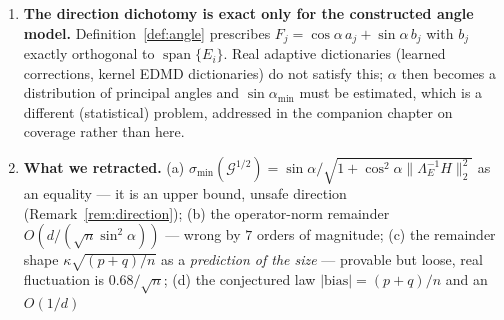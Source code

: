\documentclass[11pt]{article}
\theoremstyle{remark}
\newcommand{\Gr}{\mathcal{G}}
\newcommand{\Le}{\Lambda_E}
\newcommand{\Cnorm}{\bigl\|\Le^{-1}H\bigr\|_2^2}
\begin{document}
\begin{enumerate}
\noindent Both factors move as predicted ($q_1$ up, $q_2$ down) and the product \emph{leaves
$1$ downward}: the cancellation degrades from $0.9935$ to $0.9747$ at $\rho=0.95$, $n=200$,
and $q_1q_2$ stays monotone in $\rho$ and closer to $1$ at $n=600$. Every cell satisfies
$\mathrm{err}/\mathrm{bound}<1$, and the four-factor identity \eqref{eq:factor} still closes
per trial ($0.8776$ against $0.8776$). So correlation makes the certificate \emph{looser}
than the dictionary scalar \eqref{eq:slackone} predicts ($1.6\%$ at $\rho=0.95$, $n=200$),
which is the safe direction, and it does not resurrect any need for a calibrated term.
We do not claim a rate: the departure is not consistent with $(p+q)/n_{\mathrm{eff}}$ for
$n_{\mathrm{eff}}=n(1-\rho)/(1+\rho)$ (that would be $1.36$ where we measure $0.025$), and
the same ordering holds at $\alpha=20^\circ$. One diagnostic worth recording: at
$\rho=0.95$, $n=200$ the mean of the per-trial product $q_1q_2$ is $0.9747$ while the
product of the two means is $0.9814$ --- that $0.7\%$ gap \emph{is} the cancellation, since
$q_1$ and $q_2$ are negatively correlated trial by trial, and it is why every closure claim
in this chapter is stated per trial rather than from column means.
What remains genuinely untested is a \emph{learned} dictionary or an MLP-regression design,
where $q_2$ can lose its structure in a direction we cannot parameterize by $\rho$;
we still consider small-sample overconfidence there to be the disappearance of $q_2$, not a
generic small-$n$ effect (script \texttt{b34}).
\item \textbf{The direction dichotomy is exact only for the constructed angle model.}
Definition~\ref{def:angle} prescribes $F_j=\cos\alpha\,a_j+\sin\alpha\,b_j$ with $b_j$
exactly orthogonal to $\operatorname{span}\{E_i\}$. Real adaptive dictionaries (learned
corrections, kernel EDMD dictionaries) do not satisfy this; $\alpha$ then becomes a
distribution of principal angles and $\sin\alpha_{\min}$ must be estimated, which is a
different (statistical) problem, addressed in the companion chapter on coverage rather
than here.
\item \textbf{What we retracted.} (a) $\sigma_{\min}(\Gr^{1/2})=\sin\alpha/
\sqrt{1+\cos^2\alpha\Cnorm}$ as an equality --- it is an upper bound, unsafe direction
(Remark~\ref{rem:direction}); (b) the operator-norm remainder $O(d/(\sqrt n\sin^2\alpha))$
--- wrong by $7$ orders of magnitude; (c) the remainder shape $\kappa\sqrt{(p+q)/n}$ as a
\emph{prediction of the size} --- provable but loose, real fluctuation is
$0.68/\sqrt n$; (d) the conjectured law $|\text{bias}|= (p+q)/n$ and an $O(1/d)$

\end{enumerate}
\end{document}
